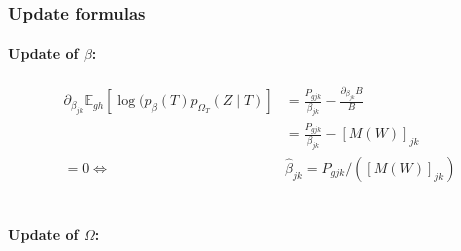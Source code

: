 \documentclass[11pt,a4paper]{article}
\newcommand{\Esp}{\mathds{E}}
\begin{document}
\subsubsection{Update formulas}
\paragraph{Update of $\beta$:}
\begin{align*}
\partial_{\beta_{jk}} \Esp_{gh} [\log (p_\beta(T)p_{\Omega_T}(Z\mid T) ] &= \frac{P_{gjk}}{\beta_{jk}} - \frac{\partial_{\beta_{jk}} B }{B} \\
&=\frac{P_{gjk}}{\beta_{jk}}  - [M(W)]_{jk} \\
=0 \iff & \boxed{\widehat{\beta}_{jk} = P_{gjk} / ([M(W)]_{jk})}
\end{align*}\\


\paragraph{Update of $\Omega$:}
\end{document}

